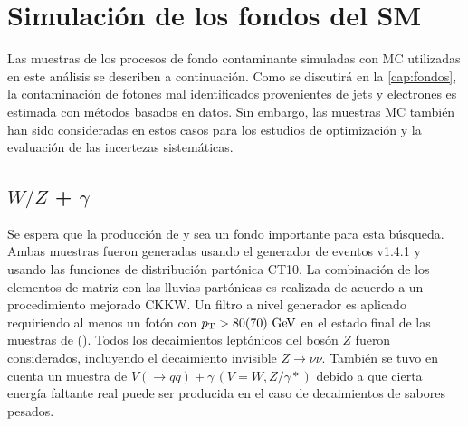 \section{Simulación de los fondos del SM}
\label{sec:bkg_samples}

\newcommand{\mccaption}{Se detallan la sección eficaz a LO para cada modo de decaimiento,
  los factores $k$ (para la normalización NLO) y las eficiencias del filtro,
  así como también la luminosidad integrada correspondiente
  a la estadística total de cada muestra.}


Las muestras de los procesos de fondo contaminante simuladas con MC utilizadas
en este análisis se describen a continuación. Como se discutirá en la
\cref{cap:fondos}, la contaminación de fotones mal identificados
provenientes de jets y electrones es estimada con métodos basados en datos. Sin
embargo, las muestras MC también han sido consideradas en estos casos para los
estudios de optimización y la evaluación de las incertezas sistemáticas.

\subsection{$W/Z$ + $\gamma$}

Se espera que la producción de {\wgam} y {\zgam} sea un fondo importante
para esta búsqueda. Ambas muestras fueron generadas usando el generador
de eventos {\sherpa} v1.4.1\cite{SherpaGen} y
usando las funciones de distribución partónica CT10.
La combinación de los elementos de matriz con las lluvias partónicas
es realizada de acuerdo a un procedimiento mejorado CKKW\cite{Catani:2001cc,Krauss:2002up}.
Un filtro a nivel generador es aplicado requiriendo al menos un fotón
con $\pt > 80 (70) \gev$ en el estado final de las muestras de {\wgam} (\zgam).
Todos los decaimientos leptónicos del bosón $Z$ fueron considerados,
incluyendo el decaimiento invisible $Z\to\nu\nu$.
También se tuvo en cuenta un muestra de $V(\to qq)+\gamma\,  (V=W,Z/\gamma*)$
debido a que cierta energía faltante real puede  ser producida en el caso
de decaimientos de sabores pesados.

